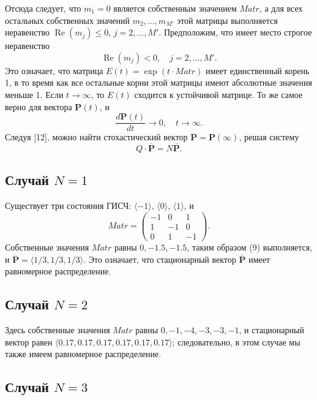 \documentclass[a4paper,12pt]{article}
\begin{document}
Отсюда следует, что $m_1 = 0$ является собственным значением $Matr$, а для всех остальных собственных значений $m_2, \ldots, m_{M'}$ этой матрицы выполняется неравенство $\operatorname{Re}(m_j) \leq 0$, $j = 2, \ldots, M'$. Предположим, что имеет место строгое неравенство
\begin{equation}
\operatorname{Re}(m_j) < 0, \quad j = 2, \ldots, M'. \tag{9}
\end{equation}
Это означает, что матрица $E(t) = \exp(t \cdot Matr)$ имеет единственный корень 1, в то время как все остальные корни этой матрицы имеют абсолютные значения меньше 1. Если $t \to \infty$, то $E(t)$ сходится к устойчивой матрице. То же самое верно для вектора $\mathbf{P}(t)$, и
\[
\frac{d\mathbf{P}(t)}{dt} \to 0, \quad t \to \infty.
\]
Следуя [12], можно найти стохастический вектор $\overline{\mathbf{P}} = \mathbf{P}(\infty)$, решая систему
\begin{equation}
Q \cdot \overline{\mathbf{P}} = N \overline{\mathbf{P}}. \tag{10}
\end{equation}

\subsection{Случай $N=1$}

Существует три состояния ГИСЧ: $\langle -1 \rangle$, $\langle 0 \rangle$, $\langle 1 \rangle$, и
\[
Matr = \begin{pmatrix}
-1 & 0 & 1 \\
1 & -1 & 0 \\
0 & 1 & -1
\end{pmatrix}.
\]
Собственные значения $Matr$ равны $0, -1.5, -1.5$, таким образом (9) выполняется, и $\overline{\mathbf{P}} = \langle 1/3, 1/3, 1/3 \rangle$. Это означает, что стационарный вектор $\overline{\mathbf{P}}$ имеет равномерное распределение.

\subsection{Случай $N=2$}

Здесь собственные значения $Matr$ равны $0, -1, -4, -3, -3, -1$, и стационарный вектор равен $\langle 0.17, 0.17, 0.17, 0.17, 0.17, 0.17 \rangle$; следовательно, в этом случае мы также имеем равномерное распределение.

\subsection{Случай $N=3$}
\end{document}
